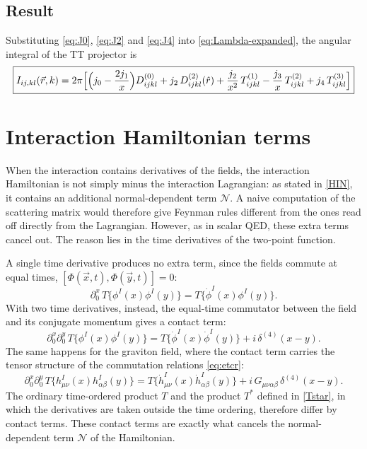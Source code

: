 \documentclass[12pt,a4paper,oneside]{article}
\numberwithin{equation}{section}   %
\begin{document}
\subsection{Result}
Substituting \eqref{eq:J0}, \eqref{eq:J2} and \eqref{eq:J4} into
\eqref{eq:Lambda-expanded}, the angular integral of the TT projector is
\begin{equation}
\boxed{
I_{ij,kl}(\vec r,k)=2\pi\Bigl[\Bigl(j_0-\frac{2j_1}{x}\Bigr)D^{(0)}_{ijkl}
+j_2\,D^{(2)}_{ijkl}(\hat r)
+\frac{j_2}{x^2}\,T^{(1)}_{ijkl}-\frac{j_3}{x}\,T^{(2)}_{ijkl}+j_4\,T^{(3)}_{ijkl}\Bigr]
}
\label{eq:I-result}
\end{equation}


\section{Interaction Hamiltonian terms}
\label{app:normal-terms}

When the interaction contains derivatives of the fields, the interaction
Hamiltonian is not simply minus the interaction Lagrangian: as stated in
\eqref{HIN}, it contains an additional normal-dependent term $\mathcal N$.
A naive computation of the scattering matrix would therefore give Feynman
rules different from the ones read off directly from the Lagrangian.
However, as in scalar QED, these extra terms cancel out. The reason lies in the
time derivatives of the two-point function.

A single time derivative produces no extra term, since the fields commute at
equal times, $[\Phi(\vec x,t),\Phi(\vec y,t)]=0$:
\begin{equation}
    \partial_0^x\,T\{\phi^I(x)\phi^I(y)\}= T\{\dot\phi^I(x)\phi^I(y)\}.
\end{equation}
With two time derivatives, instead, the equal-time commutator between the
field and its conjugate momentum gives a contact term:
\begin{equation}\label{contact}
    \partial_0^x\partial_0^y\,T\{\phi^I(x)\phi^I(y)\}
    = T\{\dot\phi^I(x)\dot\phi^I(y)\} + i\,\delta^{(4)}(x-y) .
\end{equation}
The same happens for the graviton field, where the contact term carries the
tensor structure of the commutation relations \eqref{eq:etcr}:
\begin{equation}
    \partial_0^x\partial_0^y\,T\{h^I_{\mu\nu}(x)h^I_{\alpha\beta}(y)\}
    = T\{\dot h^I_{\mu\nu}(x)\dot h^I_{\alpha\beta}(y)\}
    + i\,G_{\mu\nu\alpha\beta}\,\delta^{(4)}(x-y) .
\end{equation}
The ordinary time-ordered product $T$ and the product $T^*$ defined in
\eqref{Tstar}, in which the derivatives are taken outside the time ordering,
therefore differ by contact terms. These contact terms are exactly what cancels
the normal-dependent term $\mathcal N$ of the Hamiltonian.
\end{document}
